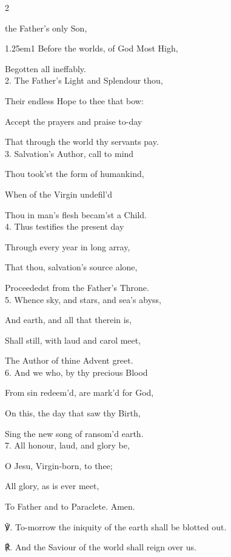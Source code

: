 \begin{multicols}{2}
\sloppy

 the Father's only Son,


\begin{hangparas}{1.25em}{1}
Before the worlds, of God Most High,

Begotten all ineffably.\\

2. The Father's Light and Splendour thou,

Their endless Hope to thee that bow:

Accept the prayers and praise to-day

That through the world thy servants pay.\\

3. Salvation's Author, call to mind

Thou took'st the form of humankind,

When of the Virgin undefil'd

Thou in man's flesh becam'st a Child.\\

4. Thus testifies the present day

Through every year in long array,

That thou, salvation's source alone,

Proceededst from the Father's Throne.\\

5. Whence sky, and stars, and sea's abyss,

And earth, and all that therein is,

Shall still, with laud and carol meet,

The Author of thine Advent greet.\\

6. And we who, by thy precious Blood

From sin redeem'd, are mark'd for God,

On this, the day that saw thy Birth,

Sing the new song of ransom'd earth.\\

7. All honour, laud, and glory be,

O Jesu, Virgin-born, to thee;

All glory, as is ever meet,

To Father and to Paraclete. Amen.\\
\end{hangparas}

℣. To-morrow the iniquity of the earth shall be blotted out.

℟. And the Saviour of the world shall reign over us.


\fussy	
\end{multicols}


